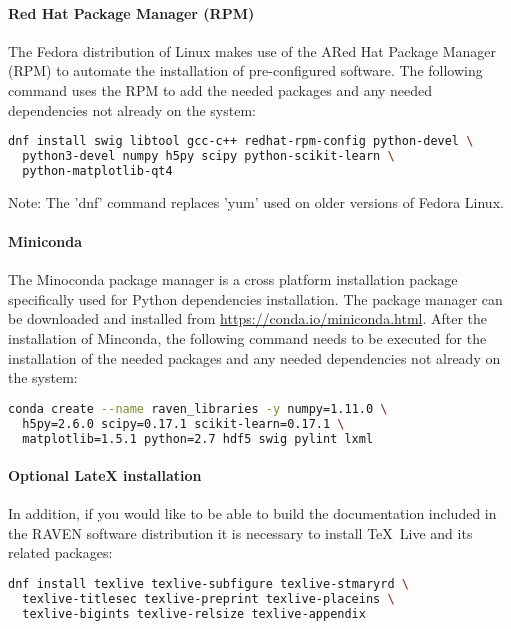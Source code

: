 \paragraph{Red Hat Package Manager (RPM)}
The Fedora distribution of Linux makes use of the ARed Hat Package Manager (RPM)
to automate the installation of pre-configured software. The
following command uses the RPM to add the needed packages and any
needed dependencies not already on the system:

\begin{lstlisting}[language=bash]
dnf install swig libtool gcc-c++ redhat-rpm-config python-devel \
  python3-devel numpy h5py scipy python-scikit-learn \
  python-matplotlib-qt4
\end{lstlisting}

Note: The 'dnf' command replaces 'yum' used on older versions of
Fedora Linux.

\paragraph{Miniconda}
The Minoconda package manager is a cross platform installation package specifically
used for Python dependencies installation.
The package manager can be downloaded and installed from \url{https://conda.io/miniconda.html}.
After the installation of Minconda, the following command needs to be executed for the installation of
the needed packages and any needed dependencies not already on the system:

\begin{lstlisting}[language=bash]
 conda create --name raven_libraries -y numpy=1.11.0 \
  h5py=2.6.0 scipy=0.17.1 scikit-learn=0.17.1 \
  matplotlib=1.5.1 python=2.7 hdf5 swig pylint lxml
\end{lstlisting}

\paragraph{Optional LateX installation}
In addition, if you would like to be able to build the documentation
included in the RAVEN software distribution it is necessary to install
\TeX~Live and its related packages:
\begin{lstlisting}[language=bash]
dnf install texlive texlive-subfigure texlive-stmaryrd \
  texlive-titlesec texlive-preprint texlive-placeins \
  texlive-bigints texlive-relsize texlive-appendix
\end{lstlisting}

\goToRavenInstallation

